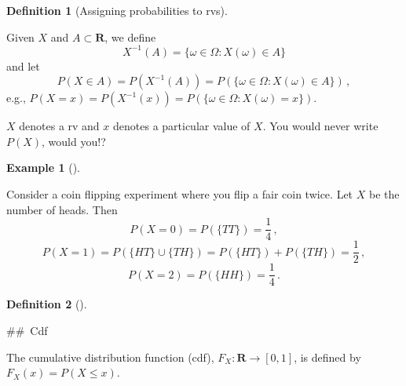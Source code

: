 \documentclass[
  a4paper,
  oneside]{book}
\theoremstyle{definition}
\newtheorem{definition}{Definition}[chapter]
\theoremstyle{definition}
\newtheorem{example}{Example}[chapter]
\theoremstyle{definition}
\theoremstyle{plain}
\theoremstyle{remark}
\begin{document}
\begin{definition}[Assigning probabilities to
rvs]\protect\hypertarget{def-prob-rv}{}\label{def-prob-rv}

Given \(X\) and \(A \subset \mathbf{R}\), we define
\[X^{-1}(A) = \{\omega \in \Omega : X(\omega) \in A\}\] and let
\[P(X \in A) = P(X^{-1}(A)) = P(\{\omega \in \Omega : X(\omega) \in A\})\,,\]
e.g.,
\(P(X=x) = P(X^{-1}(x)) = P(\{\omega \in \Omega : X(\omega) = x\})\).

\end{definition}

\begin{tcolorbox}[enhanced jigsaw, colframe=quarto-callout-warning-color-frame, breakable, toprule=.15mm, bottomrule=.15mm, title=\textcolor{quarto-callout-warning-color}{\faExclamationTriangle}\hspace{0.5em}{Warning}, arc=.35mm, opacityback=0, left=2mm, opacitybacktitle=0.6, bottomtitle=1mm, toptitle=1mm, titlerule=0mm, rightrule=.15mm, colback=white, colbacktitle=quarto-callout-warning-color!10!white, coltitle=black, leftrule=.75mm]

\(X\) denotes a rv and \(x\) denotes a particular value of \(X\). You
would never write \(P(X)\), would you!?

\end{tcolorbox}

\begin{example}[]\protect\hypertarget{exm-rv-3}{}\label{exm-rv-3}

Consider a coin flipping experiment where you flip a fair coin twice.
Let \(X\) be the number of heads. Then
\[P(X=0) = P(\{TT\}) = \frac{1}{4}\,,\]
\[P(X=1) = P(\{HT\} \cup \{TH\}) = P(\{HT\}) + P(\{TH\}) = \frac{1}{2}\,,\]
\[P(X=2) = P(\{HH\}) = \frac{1}{4}\,.\]

\end{example}

\begin{definition}[]\protect\hypertarget{def-cdf}{}\label{def-cdf}

\#\#~Cdf

The cumulative distribution function (cdf),
\(F_X:\mathbf{R} \to [0,1]\), is defined by \(F_X(x) = P(X \leq x)\).

\end{definition}
\end{document}
